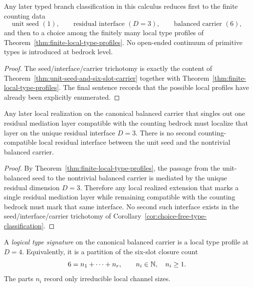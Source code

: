 \begin{corollary}
\label{cor:choice-free-type-classification}
Any later typed branch classification in this calculus reduces first to
the finite counting data
\[
\text{unit seed }(1),\qquad
\text{residual interface }(D=3),\qquad
\text{balanced carrier }(6),
\]
and then to a choice among the finitely many local type profiles of
Theorem~\ref{thm:finite-local-type-profiles}. No open-ended continuum of
primitive types is introduced at bedrock level.
\end{corollary}

\begin{proof}
The seed/interface/carrier trichotomy is exactly the content of
Theorem~\ref{thm:unit-seed-and-six-slot-carrier} together with
Theorem~\ref{thm:finite-local-type-profiles}. The final sentence records that
the possible local profiles have already been explicitly enumerated.
\end{proof}

\begin{corollary}
\label{cor:residual-localization-on-d3}
Any later local realization on the canonical balanced carrier that singles out
one residual mediation layer compatible with the counting bedrock must localize
that layer on the unique residual interface \(D=3\). There is no second
counting-compatible local residual interface between the unit seed and the
nontrivial balanced carrier.
\end{corollary}

\begin{proof}
By Theorem~\ref{thm:finite-local-type-profiles}, the passage from the
unit-balanced seed to the nontrivial balanced carrier is mediated by the unique
residual dimension \(D=3\). Therefore any local realized extension that marks a
single residual mediation layer while remaining compatible with the counting
bedrock must mark that same interface. No second such interface exists in the
seed/interface/carrier trichotomy of
Corollary~\ref{cor:choice-free-type-classification}.
\end{proof}

\begin{definition}
\label{def:logical-type-signature}
A \emph{logical type signature} on the canonical balanced carrier is a local
type profile at $D=4$. Equivalently, it is a partition of the six-slot closure
count
\[
6=n_1+\cdots+n_r,
\qquad
n_i\in\mathbb{N},\quad n_i\ge 1.
\]
The parts $n_i$ record only irreducible local channel sizes.
\end{definition}


